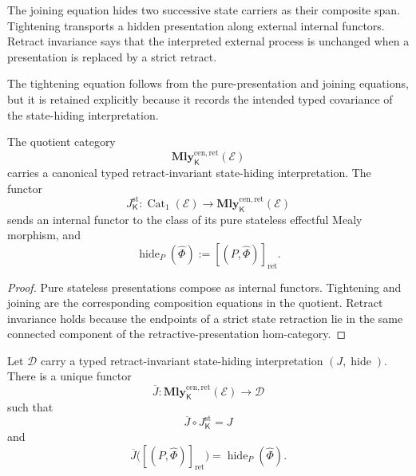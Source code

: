 The joining equation hides two successive state carriers as their composite
span.  Tightening transports a hidden presentation along external internal
functors.  Retract invariance says that the interpreted external process is
unchanged when a presentation is replaced by a strict retract.

The tightening equation follows from the pure-presentation and joining
equations, but it is retained explicitly because it records the intended
typed covariance of the state-hiding interpretation.

\begin{proposition}
\label{prop:canonical-retract-invariant-state-hiding}
The quotient category
\[
    \mathbf{Mly}^{\mathrm{cen},\mathrm{ret}}_{\mathsf K}(\mathcal E)
\]
carries a canonical typed retract-invariant state-hiding interpretation.  The
functor
\[
    J^{\mathrm{st}}_{\mathsf K}:
    \operatorname{Cat}_1(\mathcal E)
    \longrightarrow
    \mathbf{Mly}^{\mathrm{cen},\mathrm{ret}}_{\mathsf K}(\mathcal E)
\]
sends an internal functor to the class of its pure stateless effectful Mealy
morphism, and
\[
    \operatorname{hide}_P(\widehat\Phi)
    :=
    [(P,\widehat\Phi)]_{\mathrm{ret}}.
\]
\end{proposition}

\begin{proof}
Pure stateless presentations compose as internal functors.  Tightening and
joining are the corresponding composition equations in the quotient.
Retract invariance holds because the endpoints of a strict state retraction
lie in the same connected component of the retractive-presentation
hom-category.
\end{proof}

\begin{theorem}
\label{thm:universal-retractive-state-presentation-quotient}
Let \(\mathcal D\) carry a typed retract-invariant state-hiding
interpretation \((J,\operatorname{hide})\).  There is a unique functor
\[
    \overline J:
    \mathbf{Mly}^{\mathrm{cen},\mathrm{ret}}_{\mathsf K}(\mathcal E)
    \longrightarrow
    \mathcal D
\]
such that
\[
    \overline J\circ J^{\mathrm{st}}_{\mathsf K}
    =
    J
\]
and
\[
    \overline J
    \bigl(
        [(P,\widehat\Phi)]_{\mathrm{ret}}
    \bigr)
    =
    \operatorname{hide}_P(\widehat\Phi).
\]
\end{theorem}

